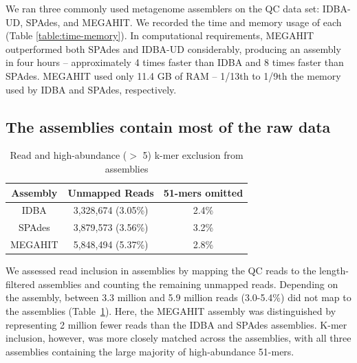 \documentclass[11pt]{article}
\begin{document}
 We ran three commonly used metagenome assemblers on the QC data set:
IDBA-UD, SPAdes, and MEGAHIT. We recorded the time and memory usage of
each (Table \ref{table:time-memory}).  In computational requirements, MEGAHIT outperformed both
SPAdes and IDBA-UD considerably, producing an assembly in four hours --
approximately 4 times faster than IDBA and 8 times faster than
SPAdes.  MEGAHIT used only 11.4 GB of RAM -- 1/13th to 1/9th
the memory used by IDBA and SPAdes, respectively.


\subsection*{The assemblies contain most of the raw data}




\begin{table}[!h]
\centering
\caption{Read and high-abundance ($>$ 5) k-mer exclusion from assemblies}
\begin{tabular}{|c|c|c|}\hline
  \textbf{Assembly} & \textbf{Unmapped Reads} & \textbf {51-mers omitted}
  \\ \hline
IDBA &3,328,674 (3.05\%)&  2.4\% \\ \hline
SPAdes &3,879,573 (3.56\%) &  3.2\% \\ \hline
MEGAHIT &5,848,494 (5.37\%) &   2.8\% \\ \hline
\end{tabular}
\label{table:reads-kmers}
\end{table}

We assessed read inclusion in assemblies by mapping the QC reads to
the length-filtered assemblies and counting the remaining unmapped
reads. Depending on the assembly, between 3.3 million and 5.9 million
reads (3.0-5.4\%) did not map to the assemblies
(Table~\ref{table:reads-kmers}). Here, the MEGAHIT assembly was
distinguished by representing 2 million fewer reads than the IDBA and
SPAdes assemblies.
K-mer inclusion, however, was more closely matched across the assemblies,
with all three assemblies containing the large majority of high-abundance
51-mers.
\end{document}
